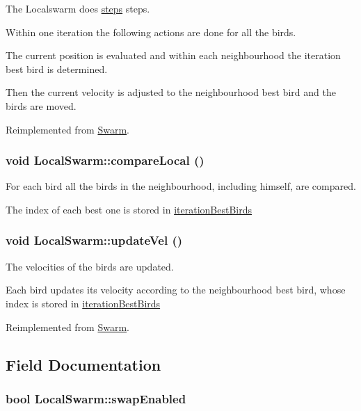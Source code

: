 The Localswarm does \hyperlink{runpso_8cpp_b4ae7205573977222eadd0795db193e2}{steps} steps. 

Within one iteration the following actions are done for all the birds.\par
 The current position is evaluated and within each neighbourhood the iteration best bird is determined. \par
 Then the current velocity is adjusted to the neighbourhood best bird and the birds are moved. 

Reimplemented from \hyperlink{classSwarm_7ab61f9797ce80e2edfb2bd881d7147c}{Swarm}.\hypertarget{classLocalSwarm_86d8eca005f9925ef63433503476d7ff}{
\subsubsection{\setlength{\rightskip}{0pt plus 5cm}void LocalSwarm::compareLocal ()}}
\label{classLocalSwarm_86d8eca005f9925ef63433503476d7ff}


For each bird all the birds in the neighbourhood, including himself, are compared. 

The index of each best one is stored in \hyperlink{classLocalSwarm_6364776b43399f20b45a2f795937bde0}{iterationBestBirds} \hypertarget{classLocalSwarm_08e4a17b8b74ff1c4da77975140613e7}{
\subsubsection{\setlength{\rightskip}{0pt plus 5cm}void LocalSwarm::updateVel ()}}
\label{classLocalSwarm_08e4a17b8b74ff1c4da77975140613e7}


The velocities of the birds are updated. 

Each bird updates its velocity according to the neighbourhood best bird, whose index is stored in \hyperlink{classLocalSwarm_6364776b43399f20b45a2f795937bde0}{iterationBestBirds} 

Reimplemented from \hyperlink{classSwarm_be668c680f5bdd27bd2c4244a8a431bf}{Swarm}.

\subsection{Field Documentation}
\hypertarget{classLocalSwarm_ee2611a28517a417e7165f68b2d994d2}{
\subsubsection{\setlength{\rightskip}{0pt plus 5cm}bool {\bf LocalSwarm::swapEnabled}}}
\label{classLocalSwarm_ee2611a28517a417e7165f68b2d994d2}


